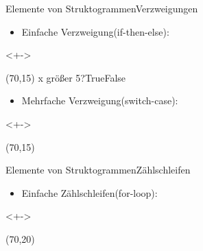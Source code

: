 \begin{frame}{Elemente von Struktogrammen}{Verzweigungen}
\begin{itemize}
    \item <+->Einfache Verzweigung(if-then-else):
\end{itemize}
\begin{onlyenv}<+->
\begin{centernss}
\begin{struktogramm}(70,15)
            {x größer 5?}{True}{False}
        \change
        \ifend
    \end{struktogramm}
\end{centernss}
\end{onlyenv}
\begin{itemize}
    \item <+-> Mehrfache Verzweigung(switch-case):
\end{itemize}
\begin{onlyenv}<+->
\begin{centernss}
    \begin{struktogramm}(70,15)
        \caseend
    \end{struktogramm}
\end{centernss}
\end{onlyenv}
\end{frame}

\begin{frame}{Elemente von Struktogrammen}{Zählschleifen}
\begin{itemize}
    \item <+->Einfache Zählschleifen(for-loop):
\end{itemize}
\begin{onlyenv}<+->
\begin{centernss}
\begin{struktogramm}(70,20)
    \whileend
\end{struktogramm}
\end{centernss}
\end{onlyenv}
\end{frame}

